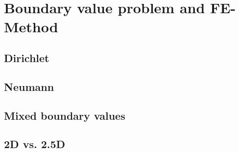 \section{Boundary value problem and FE-Method}\label{sect:crmod_boundary_fe}
\subsection{Dirichlet}\label{sub:crmod_dirichlet}
\subsection{Neumann}\label{sub:crmod_neumann}
\subsection{Mixed boundary values}\label{sub:crmod_mixed}
\subsection{2D vs. 2.5D}\label{sub:crmod_2dvs25d}